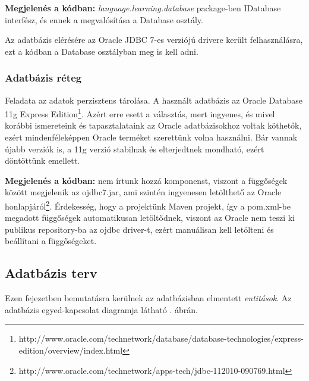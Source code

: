 \documentclass[11pt, a4paper]{article}
\begin{document}
    \textbf{Megjelenés a kódban:} \textit{language.learning.database} package-ben IDatabase interfész, és ennek a megvalósítása a Database osztály.
    
    Az adatbázis elérésére az Oracle JDBC 7-es verziójú drivere került felhasználásra, ezt a kódban a Database osztályban meg is kell adni.
    
    \subsubsection{Adatbázis réteg}
    Feladata az adatok perzisztens tárolása. A használt adatbázis az Oracle Database 11g Express Edition\footnote{http://www.oracle.com/technetwork/database/database-technologies/express-edition/overview/index.html}. Azért erre esett a választás, mert ingyenes, és mivel korábbi ismereteink és tapasztalataink az Oracle adatbázisokhoz voltak köthetők, ezért mindenféleképpen Oracle terméket szerettünk volna használni. Bár vannak újabb verziók is, a 11g verzió stabilnak és elterjedtnek mondható, ezért döntöttünk emellett.
    
   \textbf{ Megjelenés a kódban:} nem írtunk hozzá komponenst, viszont a függőségek között megjelenik az ojdbc7.jar, ami szintén ingyenesen letölthető az Oracle honlapjáról\footnote{http://www.oracle.com/technetwork/apps-tech/jdbc-112010-090769.html}. Érdekesség, hogy a projektünk Maven projekt, így a pom.xml-be megadott függőségek automatikusan letöltődnek, viszont az Oracle nem teszi ki publikus repository-ba az ojdbc driver-t, ezért manuálisan kell letölteni és beállítani a függőségeket.
    
    \subsection{Adatbázis terv}
    Ezen fejezetben bemutatásra kerülnek az adatbázisban elmentett \emph{entitások}. Az adatbázis egyed-kapcsolat diagramja látható . ábrán.
    
\end{document}
